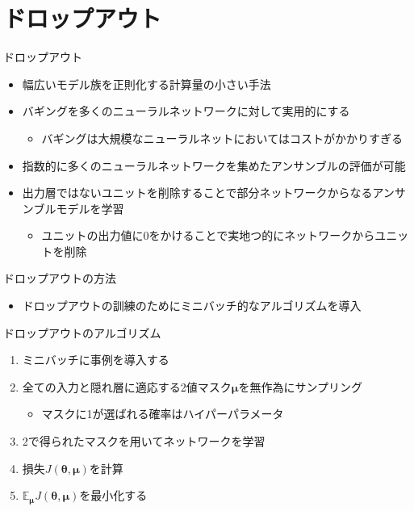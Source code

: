 \documentclass[dvipdfmx, 10pt]{beamer}
\begin{document}

\section{ドロップアウト}


\begin{frame}{ドロップアウト}
  \begin{itemize}
    \item 幅広いモデル族を正則化する計算量の小さい手法
    \item バギングを多くのニューラルネットワークに対して実用的にする
    \begin{itemize}
      \item バギングは大規模なニューラルネットにおいてはコストがかかりすぎる
    \end{itemize}
    \item 指数的に多くのニューラルネットワークを集めたアンサンブルの評価が可能
    \item 出力層ではないユニットを削除することで部分ネットワークからなるアンサンブルモデルを学習
    \begin{itemize}
      \item ユニットの出力値に0をかけることで実地つ的にネットワークからユニットを削除
    \end{itemize}
  \end{itemize}
\end{frame}


\begin{frame}{ドロップアウトの方法}
  \begin{itemize}
    \item ドロップアウトの訓練のためにミニバッチ的なアルゴリズムを導入
  \end{itemize}
  \begin{exampleblock}{ドロップアウトのアルゴリズム}
    \begin{enumerate}
      \item ミニバッチに事例を導入する
      \item 全ての入力と隠れ層に適応する2値マスク$\boldsymbol{\mu}$を無作為にサンプリング
      \begin{itemize}
        \item マスクに1が選ばれる確率はハイパーパラメータ
      \end{itemize}
      \item 2で得られたマスクを用いてネットワークを学習
      \item 損失$J(\boldsymbol{\theta} , \boldsymbol{\mu})$を計算
      \item $\mathbb{E}_{\boldsymbol{\mu}} J(\boldsymbol{\theta}, \boldsymbol{\mu})$を最小化する
    \end{enumerate}
  \end{exampleblock}
\end{frame}
\end{document}
